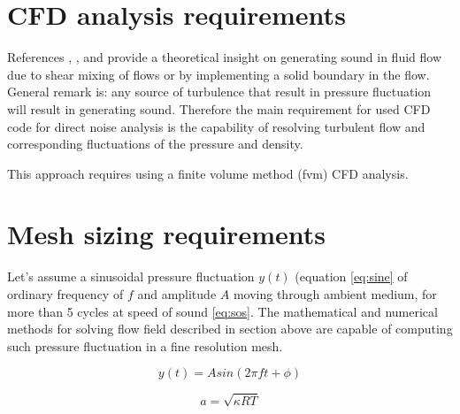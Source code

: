 \section{CFD analysis requirements} \label{cfdreq}
References \citep{Light1}, \citep{Light2}, \citep{FWH} and \citep{curle} provide a theoretical insight on generating sound in fluid flow due to shear mixing of flows or by implementing a solid boundary in the flow. General remark is: any source of turbulence that result in pressure fluctuation will result in generating sound. Therefore the main requirement for used CFD code for direct noise analysis is the capability of resolving turbulent flow and corresponding fluctuations of the pressure and density.

This approach requires using a finite volume method (fvm) CFD analysis.



\section{Mesh sizing requirements} \label{meshsize}
Let's assume a sinusoidal pressure fluctuation $y(t)$ (equation \ref{eq:sine} of ordinary frequency of $f$ and amplitude $A$ moving through ambient medium, for more than 5 cycles at speed of sound \ref{eq:sos}. The mathematical and numerical methods for solving flow field described in section above are capable of computing such pressure fluctuation in a fine resolution mesh. 

\begin{equation} \label{eq:sine}
y(t) = A sin(2 \pi f t + \phi)
\end{equation}

\begin{equation} \label{eq:sos}
a = \sqrt{\kappa R T}
\end{equation}


